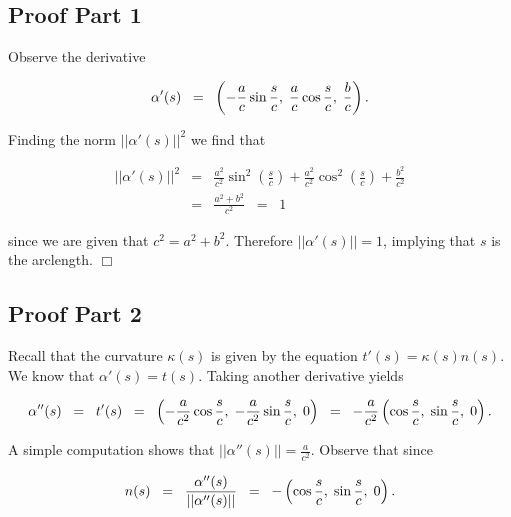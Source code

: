 \documentclass{article}
\begin{document}
\subsection*{Proof Part 1}

\noindent Observe the derivative

\begin{equation*}
\alpha'(s) \;\; = \;\; \left ( -\frac{a}{c} \sin \frac{s}{c}, \; \frac{a}{c} \cos \frac{s}{c}, \; \frac{b}{c} \right ). \\
\end{equation*}

\noindent Finding the norm $||\alpha'(s)||^2$ we find that 

\begin{eqnarray*}
||\alpha'(s)||^2 & = & \frac{a^2}{c^2} \sin^2\left ( \frac{s}{c} \right ) + \frac{a^2}{c^2} \cos^2 \left ( \frac{s}{c} \right ) + \frac{b^2}{c^2} \\
& = & \frac{a^2 + b^2}{c^2} \;\; = \;\;1
\end{eqnarray*}

\noindent since we are given that $c^2 = a^2 + b^2$.  Therefore $||\alpha'(s)|| = 1$, implying that $s$ is the arclength.  \hfill $\Box$


\subsection*{Proof Part 2}

\noindent Recall that the curvature $\kappa(s)$ is given by the equation $t'(s) = \kappa(s)n(s)$.  We know that $\alpha'(s) = t(s)$.  Taking another derivative yields

\begin{equation*}
\alpha''(s) \;\; = \;\; t'(s) \;\; = \;\; \left ( - \frac{a}{c^2} \cos \frac{s}{c}, \; - \frac{a}{c^2} \sin \frac{s}{c}, \; 0 \right ) \;\; = \;\; - \frac{a}{c^2} \left ( \cos \frac{s}{c}, \; \sin \frac{s}{c}, \; 0 \right ). \\
\end{equation*}

\noindent A simple computation shows that $||\alpha''(s)|| = \frac{a}{c^2}$.  Observe that since

\begin{equation*}
n(s) \;\; = \;\; \frac{\alpha''(s)}{||\alpha''(s)||} \;\; = \;\; - \left ( \cos \frac{s}{c}, \; \sin \frac{s}{c}, \; 0 \right ). \\
\end{equation*}
\end{document}
